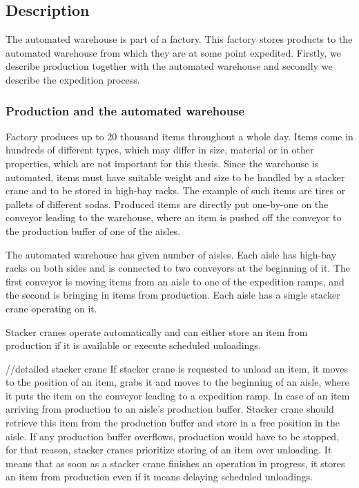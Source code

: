 \documentclass{ctuthesis}
\begin{document}
\subsection{Description}
\label{subsec:Description}
The automated warehouse is part of a factory. This factory stores products to the automated warehouse from which they are at some point expedited. Firstly, we describe production together with the automated warehouse and secondly we describe the expedition process.

\subsubsection{Production and the automated warehouse}

Factory produces up to 20 thousand items throughout a whole day. Items come in hundreds of different types, which may differ in size, material or in other properties, which are not important for this thesis. Since the warehouse is automated, items must have suitable weight and size to be handled by a stacker crane and to be stored in high-bay racks. The example of such items are tires or pallets of different sodas. Produced items are directly put one-by-one on the conveyor leading to the warehouse, where an item is pushed off the conveyor to the production buffer of one of the aisles.

The automated warehouse has given number of aisles. Each aisle has high-bay racks on both sides and is connected to two conveyors at the beginning of it. The first conveyor is moving items from an aisle to one of the expedition ramps, and the second is bringing in items from production. Each aisle has a single stacker crane operating on it.

Stacker cranes operate automatically and can either store an item from production if it is available or execute scheduled unloadings. 

//detailed stacker crane
If stacker crane is requested to unload an item, it moves to the position of an item, grabs it and moves to the beginning of an aisle, where it puts the item on the conveyor leading to a expedition ramp. In case of an item arriving from production to an aisle's production buffer. Stacker crane should retrieve this item from the production buffer and store in a free position in the aisle. If any production buffer overflows, production would have to be stopped, for that reason, stacker cranes prioritize storing of an item over unloading. It means that as soon as a stacker crane finishes an operation in progress, it stores an item from production even if it means delaying scheduled unloadings.
\end{document}
